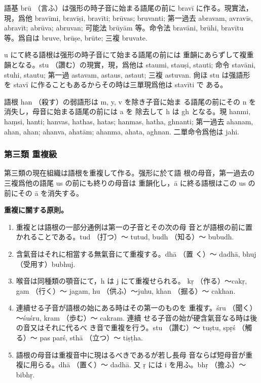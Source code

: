 \numberParagraph
語基 brū （言ふ）は强形の時子音に始まる語尾の前に
bravī に作る。現實法，現，爲他 bravīmi, bravīṣi, bravīti;
brūvas; bruvanti; 第一過去 abravam, avravīs, abravīt;
abrūva; abruvan; 可能法 brūyām 等。命令法 bravāni, brūhi,
bravītu 等。爲自は bruve, brūṣe, brūte; 三複 bruvate.

\numberParagraph
u にて終る語根は强形の時子音にて始まる語尾の前には
重韻にあらずして複重韻となる。stu （讚む）の現實，現，爲他は
staumi, stauṣi, stauti; 命令 stavāni, stuhi, stautu; 第一過
astavam, astaus, astaut; 三複 astuvan. 尙ほ stu は强語形
を stavī に作ることもあるからその時は三單現爲他は stavīti で
ある。

\numberParagraph
語根 han （殺す）の弱語形は m, y, v を除き子音に始ま
る語尾の前にその n を消失し，母音に始まる語尾の前には a を
除去して h は gh となる。現 hanmi, haṃsi, hanti; hanvas,
hathas, hatas; hanmas, hatha, ghnanti; 第一過去 ahanam,
ahan, ahan; ahanva, ahatām; ahanma, ahata,
aghnan. 二單命令爲他は jahi.

\subsubsection{第三類 重複級}
\numberParagraph \label{np:145}
第三類の現在組織は語根を重複して作る。强形に於て語
根の母音，第一過去の三複爲他の語尾 us の前にも終りの母音は
重韻化し，ā に終る語根はこの us の前にその ā を消失する。

\numberParagraph \textbf{重複に關する原則。}
\begin{enumerate}[label=(\alph*)]
\item 重複とは語根の一部分通例は第一の子音とその次の母
音とが語根の前に置かれることである。tud （打つ）～
tutud, budh （知る）～ bubudh.
\item 含氣音はそれに相當する無氣音にて重複する。dhā （置
く）～ dadhā, bhuj （受用す）bubhuj.
\item 喉音は同種類の顎音にて，h は j にて重複せられる。
kṛ （作る）～cakṛ, gam （行く）～ jagam, hu （供ふ）～juhu,
khan （掘る）～ cakhan.
\item 連續せる子音が語根の始にある時はその第一のものを
重複す。śru （聞く）～śuśru, kram （歩む）～ cakram. 連續
せる子音の始が硬含氣音なる時は後の音又はそれに代るべ
き音で重複を行う。stu （讚む）～ tuṣtu, spṛś （觸る）～ pas\-%
parś, sthā （立つ）～ tiṣṭha.
\item 語根の母音は重複音中に現はるべきであるが若し長母
音ならば短母音が重複に用らる。dhā （置く）～ dadhā. 又
ṛ には i を用ふ。bhṛ （擔ふ）～ bibhṛ.
\end{enumerate}

